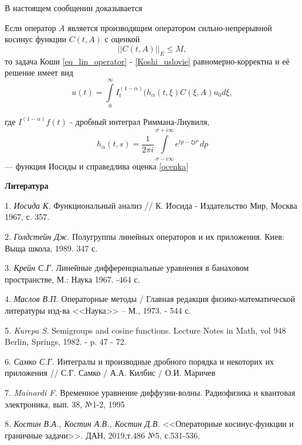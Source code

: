 В настоящем сообщении доказывается
	\begin{theorem}
		Если оператор $A$ является производящим оператором сильно-непрерывной косинус функции $C(t,A)$ с оценкой
		\begin{equation}
			||C(t,A)||_E \leq M,
		\end{equation}
		то задача Коши \ref{eq_lin_operator} - \ref{Koshi_uslovie} равномерно-корректна и её решение имеет вид
		\begin{equation}
			u(t) = \int\limits^{\infty}_0 I^{(1-\alpha)}_t (h_{\alpha}(t, \xi) C(\xi, A)u_0 d\xi,
		\end{equation}
	\end{theorem}
	где $I^{(1-\alpha)}f(t)$ - дробный интеграл Риммана-Лиувиля,
	$$
		h_\alpha(t,s) = \frac{1}{2\pi i} \int\limits^{\sigma + i\infty}_{\sigma - i \infty} e^{tp-\xi p^{\alpha}} dp
	$$ --- функция Иосиды
	и справедлива оценка \ref{ocenka}

\smallskip \centerline {\bf Литература} \nopagebreak

1. {\it Иосида К.} Функциональный анализ // К. Иосида - Издательство Мир, Москва 1967, с. 357.

2. {\it Голдстейн Дж.} Полугруппы линейных операторов и их приложения. Киев: Выща школа, 1989. 347 с.

3. {\it Крейн С.Г.} Линейные дифференциальные уравнения в банаховом пространстве, М.: Наука 1967. -464 с.

4. {\it Маслов В.П.} Операторные методы / Главная редакция физико-математической литературы изд-ва <<Наука>> -- М., 1973. - 544 с.

5. {\it Kurepa S.} Semigroups  and cosine functions. Lecture Notes in Math, vol 948 Berlin, Springs, 1982. - p. 47 - 72.

6. {\it Самко С.Г.} Интегралы и производные дробного порядка и некоторих их приложения // С.Г. Самко / А.А. Килбис / О.И. Маричев

7. {\it Mainardi F.} Временное уравнение диффузии-волны. Радиофизика и квантовая электроника, вып. 38, №1-2, 1995

8. {\it Костин В.А., Костин А.В., Костин Д.В.} <<Операторные косинус-функции и граничные задачи>>. ДАН, 2019,т.486 №5, с.531-536.


